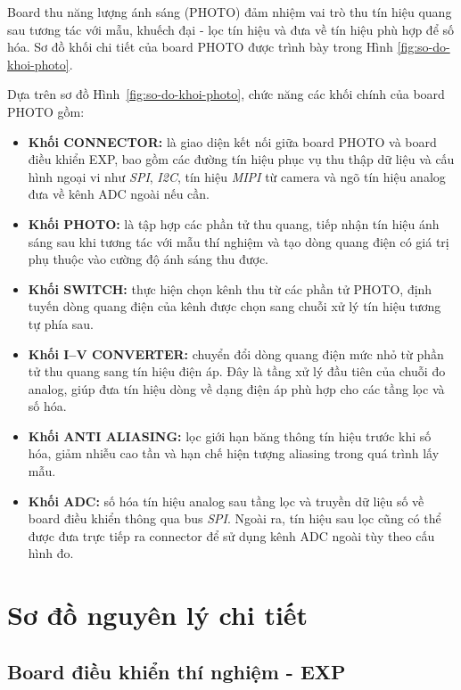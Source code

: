 Board thu năng lượng ánh sáng (PHOTO) đảm nhiệm vai trò thu tín hiệu quang sau tương tác với mẫu, khuếch đại - lọc tín hiệu và đưa về tín hiệu phù hợp để số hóa.
Sơ đồ khối chi tiết của board PHOTO được trình bày trong Hình \ref{fig:so-do-khoi-photo}.

Dựa trên sơ đồ Hình~\ref{fig:so-do-khoi-photo}, chức năng các khối chính của board PHOTO gồm:
\begin{itemize}
    \item \textbf{Khối CONNECTOR:} là giao diện kết nối giữa board PHOTO và board điều khiển EXP, bao gồm các đường tín hiệu phục vụ thu thập dữ liệu và cấu hình ngoại vi như \textit{SPI}, \textit{I2C}, tín hiệu \textit{MIPI} từ camera và ngõ tín hiệu analog đưa về kênh ADC ngoài nếu cần.

    \item \textbf{Khối PHOTO:} là tập hợp các phần tử thu quang, tiếp nhận tín hiệu ánh sáng sau khi tương tác với mẫu thí nghiệm và tạo dòng quang điện có giá trị phụ thuộc vào cường độ ánh sáng thu được.

    \item \textbf{Khối SWITCH:} thực hiện chọn kênh thu từ các phần tử PHOTO, định tuyến dòng quang điện của kênh được chọn sang chuỗi xử lý tín hiệu tương tự phía sau.

    \item \textbf{Khối I--V CONVERTER:} chuyển đổi dòng quang điện mức nhỏ từ phần tử thu quang sang tín hiệu điện áp. Đây là tầng xử lý đầu tiên của chuỗi đo analog, giúp đưa tín hiệu dòng về dạng điện áp phù hợp cho các tầng lọc và số hóa.

    \item \textbf{Khối ANTI ALIASING:} lọc giới hạn băng thông tín hiệu trước khi số hóa, giảm nhiễu cao tần và hạn chế hiện tượng aliasing trong quá trình lấy mẫu.

    \item \textbf{Khối ADC:} số hóa tín hiệu analog sau tầng lọc và truyền dữ liệu số về board điều khiển thông qua bus \textit{SPI}. Ngoài ra, tín hiệu sau lọc cũng có thể được đưa trực tiếp ra connector để sử dụng kênh ADC ngoài tùy theo cấu hình đo.

\end{itemize}

\section{Sơ đồ nguyên lý chi tiết}

\subsection{Board điều khiển thí nghiệm - EXP}
\label{subsec:sche-board-dieu-khien-thi-nghiem-exp}

